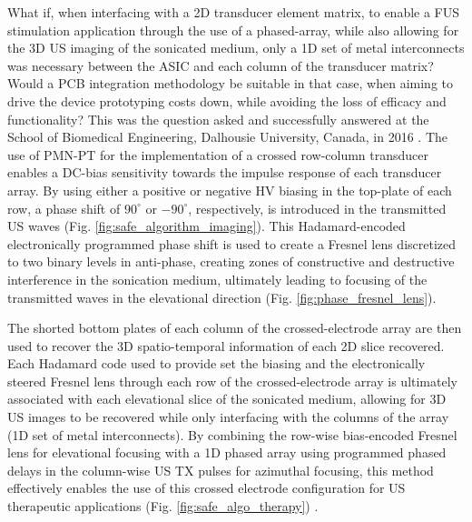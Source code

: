 What if, when interfacing with a 2D transducer element matrix, to enable a FUS stimulation application through the use of a phased-array, while also allowing for the 3D US imaging of the sonicated medium, only a 1D set of metal interconnects was necessary between the ASIC and each column of the transducer matrix? Would a PCB integration methodology be suitable in that case, when aiming to drive the device prototyping costs down, while avoiding the loss of efficacy and functionality? This was the question asked and successfully answered at the School of Biomedical Engineering, Dalhousie University, Canada, in 2016 \cite{https://ieeexplore.ieee.org/document/7728854, https://ieeexplore.ieee.org/document/8926257, https://ieeexplore.ieee.org/document/9957541}. The use of PMN-PT for the implementation of a crossed row-column transducer enables a DC-bias sensitivity towards the impulse response of each transducer array. By using either a positive or negative HV biasing in the top-plate of each row, a phase shift of $\mathrm{90^\circ}$ or $\mathrm{-90^\circ}$, respectively, is introduced in the transmitted US waves (Fig. \ref{fig:safe_algorithm_imaging}). This Hadamard-encoded electronically programmed phase shift is used to create a Fresnel lens discretized to two binary levels in anti-phase, creating zones of constructive and destructive interference in the sonication medium, ultimately leading to focusing of the transmitted waves in the elevational direction (Fig. \ref{fig:phase_fresnel_lens}). 


The shorted bottom plates of each column of the crossed-electrode array are then used to recover the 3D spatio-temporal information of each 2D slice recovered. Each Hadamard code used to provide set the biasing and the electronically steered Fresnel lens through each row of the crossed-electrode array is ultimately associated with each elevational slice of the sonicated medium, allowing for 3D US images to be recovered while only interfacing with the columns of the array (1D set of metal interconnects). By combining the row-wise bias-encoded Fresnel lens for elevational focusing with a 1D phased array using programmed phased delays in the column-wise US TX pulses for azimuthal focusing, this method effectively enables the use of this crossed electrode configuration for US therapeutic applications (Fig. \ref{fig:safe_algo_therapy}) \cite{https://ieeexplore.ieee.org/document/7728854}.

